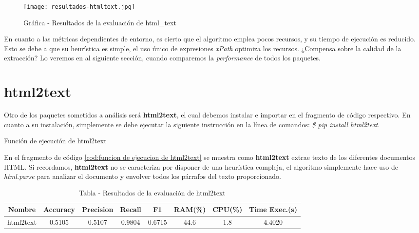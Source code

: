 \begin{figure}[tphb]
    \centering
    \texttt{[image: resultados-htmltext.jpg]}
    \caption{Gráfica - Resultados de la evaluación de html\_text}
    \label{img:grafica - resultados de la evaluacion de htmltext}
\end{figure}

En cuanto a las métricas dependientes de entorno, es cierto que el algoritmo emplea pocos recursos, y su
tiempo de ejecución es reducido. Esto se debe a que su heurística es simple, el uso único de expresiones
\emph{xPath} optimiza los recursos. ¿Compensa sobre la calidad de la extracción? Lo veremos en al siguiente
sección, cuando comparemos la \emph{performance} de todos los paquetes.

\section*{html2text}

Otro de los paquetes sometidos a análisis será \textbf{html2text}, el cual debemos instalar e importar en 
el fragmento de código respectivo. En cuanto a su instalación, simplemente se debe ejecutar la siguiente 
instrucción en la línea de comandos: \emph{\$ pip install html2text}.

\begin{codefloat}
    
    \caption{Función de ejecución de html2text}
    \label{cod:funcion de ejecucion de html2text}
\end{codefloat}

En el fragmento de código \ref{cod:funcion de ejecucion de html2text} se muestra como \textbf{html2text}
extrae texto de los diferentes documentos HTML. Si recordamos, \textbf{html2text} no se caracteriza por
disponer de una heurística compleja, el algoritmo simplemente hace uso de \emph{html.parse} para analizar
el documento y envolver todos los párrafos del texto proporcionado.

\begin{table}[h]
    \begin{center}
      \begin{tabular}{| c | c | c | c | c | c | c | c |} \hline 
       \textbf{Nombre} & \textbf{Accuracy} & \textbf{Precision}  & \textbf{Recall} & \textbf{F1} & \textbf{RAM(\%)} & \textbf{CPU(\%)} & \textbf{Time Exec.(s)} \\ \hline
       html2text & 0.5105 & 0.5107 & 0.9804 & 0.6715 & 44.6 & 1.8 & 4.4020 \\ \hline
      \end{tabular}
      \caption{Tabla - Resultados de la evaluación de html2text}
      \label{tab:tabla - resultados de la evaluacion de html2text}
    \end{center}
\end{table}

